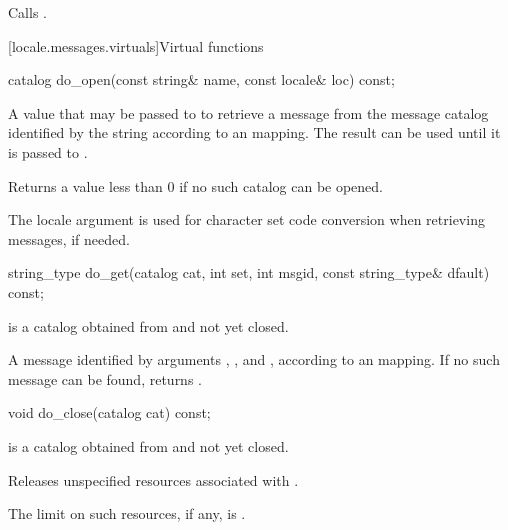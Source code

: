 \begin{itemdescr}
\pnum
\effects
Calls .
\end{itemdescr}

[locale.messages.virtuals]{Virtual functions}

%
\begin{itemdecl}
catalog do_open(const string& name, const locale& loc) const;
\end{itemdecl}

\begin{itemdescr}
\pnum
\returns
A value that may be passed to 
to retrieve a message from the message catalog
identified by the string 
according to an  mapping.
The result can be used until it is passed to .

\pnum
Returns a value less than 0 if no such catalog can be opened.

\pnum
\remarks
The locale argument  is used for
character set code conversion when retrieving messages, if needed.
\end{itemdescr}

%
\begin{itemdecl}
string_type do_get(catalog cat, int set, int msgid, const string_type& dfault) const;
\end{itemdecl}

\begin{itemdescr}
\pnum
\expects
{} is a catalog obtained from  and not yet closed.

\pnum
\returns
A message identified by
arguments , , and ,
according to
an  mapping.
If no such message can be found, returns .
\end{itemdescr}

%
\begin{itemdecl}
void do_close(catalog cat) const;
\end{itemdecl}

\begin{itemdescr}
\pnum
\expects
{} is a catalog obtained from  and not yet closed.

\pnum
\effects
Releases unspecified resources associated with  .

\pnum
\remarks
The limit on such resources, if any, is
.
\end{itemdescr}

